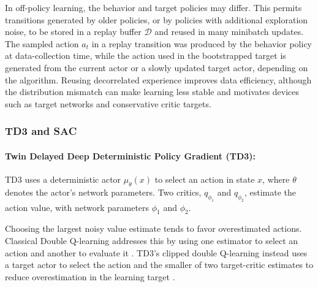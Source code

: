 \documentclass[12pt]{article}
\begin{document}
In off-policy learning, the behavior and target policies may differ. This permits transitions generated by older policies, or by policies with additional exploration noise, to be stored in a replay buffer $\mathcal{D}$ and reused in many minibatch updates. The sampled action $a_t$ in a replay transition was produced by the behavior policy at data-collection time, while the action used in the bootstrapped target is generated from the current actor or a slowly updated target actor, depending on the algorithm. Reusing decorrelated experience improves data efficiency, although the distribution mismatch can make learning less stable and motivates devices such as target networks and conservative critic targets.

\FloatBarrier
\subsubsection{TD3 and SAC}

\paragraph{Twin Delayed Deep Deterministic Policy Gradient (TD3):}
TD3 uses a deterministic actor $\mu_\theta(x)$ to select an action in state
$x$, where $\theta$ denotes the actor's network parameters. Two critics,
$q_{\phi_1}$ and $q_{\phi_2}$, estimate the action value, with network
parameters $\phi_1$ and $\phi_2$.

Choosing the largest noisy value estimate tends to favor overestimated
actions. Classical Double Q-learning addresses this by using one estimator
to select an action and another to evaluate it \cite{hasselt2010double}.
TD3's clipped double Q-learning instead uses a target actor to select the
action and the smaller of two target-critic estimates to reduce
overestimation in the learning target \cite{fujimoto2018addressing}.
\end{document}
